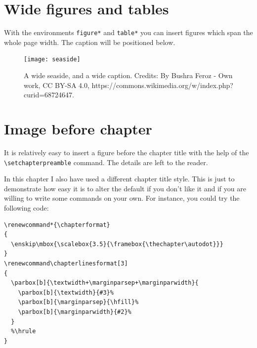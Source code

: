 \section{Wide figures and tables}

With the environments \verb|figure*| and \verb|table*| you can insert 
figures which span the whole page width. The caption will be positioned 
below.

\begin{figure}
	\texttt{[image: seaside]}
	\vspace*{-1.3cm}
	\caption[A wide seaside]{A wide seaside, and a wide caption.
		Credits: By Bushra Feroz - Own work, CC BY-SA 4.0, 
		https://commons.wikimedia.org/w/index.php?curid=68724647.
		\blindtext}
\end{figure}

\section{Image before chapter}

It is relatively easy to insert a figure before the chapter title with 
the help of the \verb|\setchapterpreamble| command. The details are left 
to the reader.

In this chapter I also have used a different chapter title style. This 
is just to demonstrate how easy it is to alter the default if you don't 
like it and if you are willing to write some commands on your own. For 
instance, you could try the following code:

\begin{lstlisting}
\renewcommand*{\chapterformat}
{
  \enskip\mbox{\scalebox{3.5}{\framebox{\thechapter\autodot}}}
}
\renewcommand\chapterlinesformat[3]
{
  \parbox[b]{\textwidth+\marginparsep+\marginparwidth}{
	\parbox[b]{\textwidth}{#3}%
	\parbox[b]{\marginparsep}{\hfill}%
	\parbox[b]{\marginparwidth}{#2}%
  }
  %\hrule
}
\end{lstlisting}
